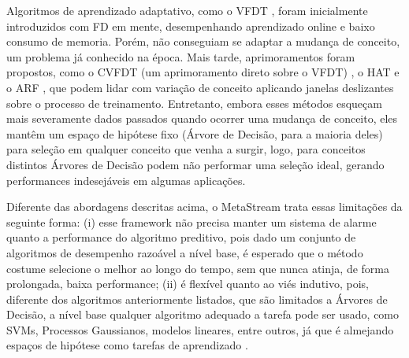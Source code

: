 Algoritmos de aprendizado adaptativo, como o VFDT \cite{domingos2000mining},
foram inicialmente introduzidos com FD em mente, desempenhando aprendizado online e baixo consumo de memoria. Porém, não conseguiam se adaptar a mudança de conceito, um problema já conhecido na época.
Mais tarde, aprimoramentos foram propostos, como o CVFDT (um aprimoramento direto sobre o VFDT) \cite{hulten2001mining}, o HAT \cite{bifet2009adaptive} e o ARF \cite{gomes2017adaptive}, que podem lidar com variação de conceito aplicando janelas deslizantes sobre o processo de treinamento.
Entretanto, embora esses métodos esqueçam mais severamente dados passados quando ocorrer uma mudança de conceito, eles mantêm um espaço de hipótese fixo (Árvore de Decisão, para a maioria deles) para seleção em qualquer conceito que venha a surgir, logo, para conceitos distintos Árvores de Decisão podem não performar uma seleção ideal, gerando performances indesejáveis em algumas aplicações.

Diferente das abordagens descritas acima, o MetaStream trata essas limitações da seguinte forma: (i) esse framework não precisa manter um sistema de alarme quanto a performance do algoritmo preditivo, pois dado um conjunto de algoritmos de desempenho razoável a nível base, é esperado que o método costume selecione o melhor ao longo do tempo, sem que nunca atinja, de forma prolongada, baixa performance; (ii) é flexível quanto ao viés indutivo, pois, diferente dos algoritmos anteriormente listados, que são limitados a Árvores de Decisão, a nível base qualquer algoritmo adequado a tarefa pode ser usado, como SVMs, Processos Gaussianos, modelos lineares, entre outros, já que é almejando espaços de hipótese como tarefas de aprendizado \cite{rossi2014metastream}.

